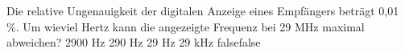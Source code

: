     {Die relative Ungenauigkeit der digitalen Anzeige eines Empfängers beträgt 0,01 \%. Um wieviel Hertz kann die angezeigte Frequenz bei 29 MHz maximal abweichen?}
    {2900 Hz}
    {290 Hz}
    {29 Hz}
    {29 kHz}
    {false}{false}